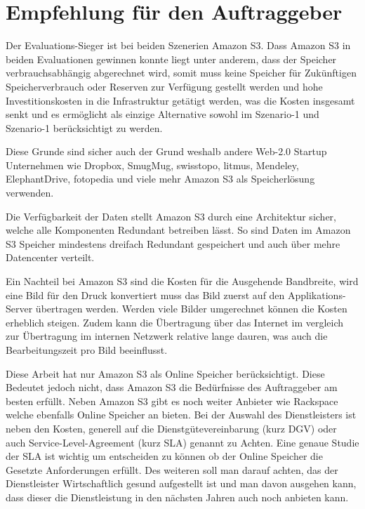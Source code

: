 \cleardoublepage
\chapter{Empfehlung für den Auftraggeber}

Der Evaluations-Sieger ist bei beiden Szenerien Amazon S3. Dass Amazon S3 in beiden Evaluationen gewinnen konnte liegt unter anderem, dass der Speicher verbrauchsabhängig abgerechnet wird, somit muss keine Speicher für Zukünftigen Speicherverbrauch oder Reserven zur Verfügung gestellt werden und hohe Investitionskosten in die Infrastruktur getätigt werden, was die Kosten insgesamt senkt und es ermöglicht als einzige Alternative sowohl im Szenario-1 und Szenario-1 berücksichtigt zu werden.

Diese Grunde sind sicher auch der Grund weshalb andere Web-2.0 Startup Unternehmen wie Dropbox, SmugMug, swisstopo, litmus, Mendeley, ElephantDrive, fotopedia und viele mehr Amazon S3 als Speicherlösung verwenden.

Die Verfügbarkeit der Daten stellt Amazon S3 durch eine Architektur sicher, welche alle Komponenten Redundant betreiben lässt. So sind Daten im Amazon S3 Speicher mindestens dreifach Redundant gespeichert und auch über mehre Datencenter verteilt.

Ein Nachteil bei Amazon S3 sind die Kosten für die Ausgehende Bandbreite, wird eine Bild für den Druck konvertiert muss das Bild zuerst auf den Applikations-Server übertragen werden. Werden viele Bilder umgerechnet können die Kosten erheblich steigen. Zudem kann die Übertragung über das Internet im vergleich zur Übertragung im internen Netzwerk relative lange dauren, was auch die Bearbeitungszeit pro Bild beeinflusst.

Diese Arbeit hat nur Amazon S3 als Online Speicher berücksichtigt. Diese Bedeutet jedoch nicht, dass Amazon S3 die Bedürfnisse des Auftraggeber am besten erfüllt. Neben Amazon S3 gibt es noch weiter Anbieter wie Rackspace welche ebenfalls Online Speicher an bieten. Bei der Auswahl des Dienstleisters ist neben den Kosten, generell auf die Dienstgütevereinbarung (kurz DGV) oder auch Service-Level-Agreement (kurz SLA) genannt zu Achten. Eine genaue Studie der SLA ist wichtig um entscheiden zu können ob der Online Speicher die Gesetzte Anforderungen erfüllt. Des weiteren soll man darauf achten, das der Dienstleister Wirtschaftlich gesund aufgestellt ist und man davon ausgehen kann, dass dieser die Dienstleistung in den nächsten Jahren auch noch anbieten kann. 

